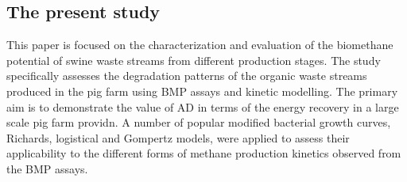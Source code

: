 \subsection{The present study}
This paper is focused on the characterization and evaluation of the biomethane potential of swine waste streams from different production stages. The study specifically assesses the degradation patterns of the organic waste streams produced in the pig farm using BMP assays and kinetic modelling. The primary aim is to demonstrate the value of AD in terms of the energy recovery in a large scale pig farm providn. A number of popular modified bacterial growth curves, Richards, logistical and Gompertz models, were applied to assess their applicability to the different forms of methane production kinetics observed from the BMP assays.